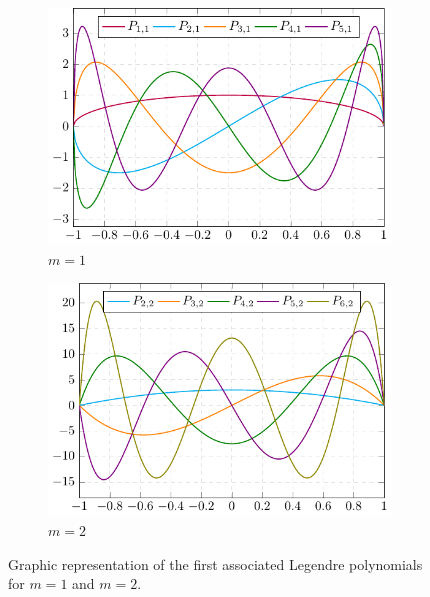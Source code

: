 \documentclass[../main.tex]{subfiles}
\begin{document}
\begin{figure}[ht]
  \centering
  \begin{subfigure}[b]{0.48\textwidth}
    \includegraphics[width=\textwidth]{Images/assolegendre1.pdf}
    \caption{$m=1$}
  \end{subfigure}
  \quad
  \begin{subfigure}[b]{0.48\textwidth}
    \includegraphics[width=\textwidth]{Images/assolegendre2.pdf}
    \caption{$m=2$}
  \end{subfigure}
  \caption{Graphic representation of the first associated Legendre polynomials for $m=1$ and $m=2$.}
\end{figure}
\end{document}
